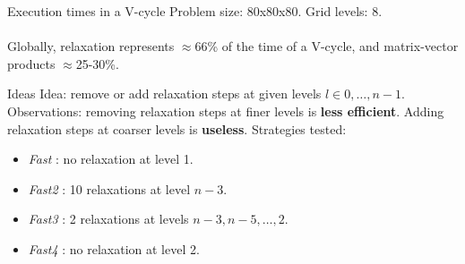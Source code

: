 \documentclass{beamer}
\begin{document}
\begin{frame}{Execution times in a V-cycle}
 Problem size: 80x80x80. Grid levels: 8.\\ \vspace{0.5cm}
 \\ \vspace{0.5cm}
Globally, relaxation represents $\approx$66\% of the time of a V-cycle, and matrix-vector products $\approx$25-30\%.
 \end{frame}

\begin{frame}{Ideas}
  Idea: remove or add relaxation steps at given levels $l \in 0,\dots,n-1$.\\
  Observations: removing relaxation steps at finer levels is \textbf{less efficient}. Adding relaxation steps at coarser levels is \textbf{useless}.
  Strategies tested:\\
  \begin{itemize}
   \item \emph{Fast} : no relaxation at level 1.
   \item \emph{Fast2} : 10 relaxations at level $n-3$.
   \item \emph{Fast3} : 2 relaxations at levels $n-3,n-5,\dots,2$.
   \item \emph{Fast4} : no relaxation at level 2.
  \end{itemize}
\end{frame}
\end{document}
